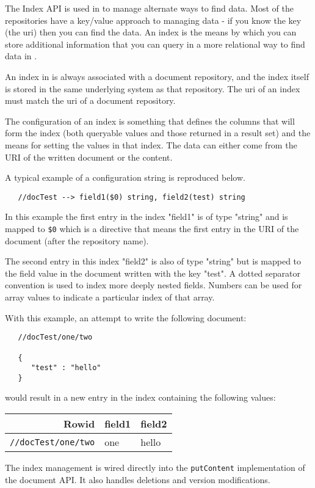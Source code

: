 The Index API is used in \Rapture to manage alternate ways to find data. Most of the
\Rapture repositories have a key/value approach to managing data - if you know the key (the uri) then
you can find the data. An index is the means by which you can
store additional information that you can query in a more relational way to find data in \Rapture.

An index in \Rapture is always associated with a document repository, and the index itself is stored
in the same underlying system as that repository. The uri of an index must match the uri of a document repository.

The configuration of an index is something that defines the columns that will form the index (both queryable values and those returned in a result set) and
the means for setting the values in that index. The data can either come from the URI of the written document or the content.

A typical example of a configuration string is reproduced below.

\begin{Verbatim}
   //docTest --> field1($0) string, field2(test) string
\end{Verbatim}

In this example the first entry in the index "field1" is of type "string" and is mapped to \verb+$0+ which
is a directive that means the first entry in the URI of the document (after the repository name).

The second entry in this index "field2" is also of type "string" but is mapped to the field value in the document written
with the key "test". A dotted separator convention is used to index more deeply nested fields. Numbers can be used for array values
to indicate a particular index of that array.

With this example, an attempt to write the following document:

\begin{Verbatim}
   //docTest/one/two

   {
      "test" : "hello"
   }
\end{Verbatim}

would result in a new entry in the index containing the following values:

\begin{table}[h]
\begin{center}
\begin{tabular}{r l l}
  Rowid & field1 & field2 \\
  \hline
  \verb+//docTest/one/two+ & one & hello \\
\end{tabular}
\end{center}
\end{table}

The index management is wired directly into the \verb+putContent+ implementation of the
document API. It also handles deletions and version modifications.
